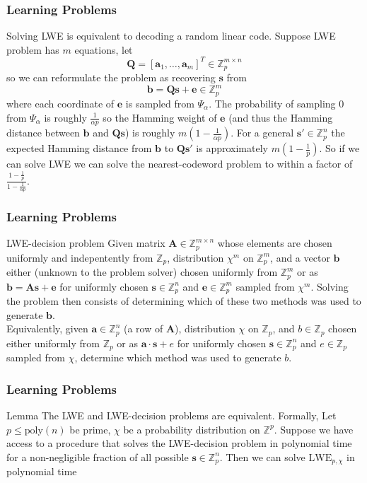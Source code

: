 \documentclass{beamer}
\renewcommand{\v}{\mathbf}
\begin{document}
\begin{frame}
\frametitle{Learning Problems}
Solving LWE is equivalent to decoding a random linear code.
Suppose LWE problem has $m$ equations, let 
\[
    \v{Q} = [\v{a}_1,\ldots,\v{a}_m]^T \in \mathbb{Z}^{m\times n}_p
\]
so we can reformulate the problem as recovering $\v{s}$ from
\[
    \v{b} = \v{Qs+e} \in \mathbb{Z}_p^m
\]
where each coordinate of $\v{e}$ is sampled from $\Psi_\alpha$.
The probability of sampling 0 from $\Psi_\alpha$ is roughly $\frac{1}{\alpha p}$
so the Hamming weight of $\v{e}$ (and thus the Hamming distance 
between $\v{b}$ and $\v{Qs}$) 
is roughly 
$m\left(1-\frac{1}{\alpha p}\right)$. 
For a general $\v{s}' \in \mathbb{Z}_p^n$ the expected Hamming distance
from $\v{b}$ to $\v{Qs}'$ is approximately $m\left(1-\frac{1}{p}\right)$.
So if we can solve LWE we can solve the nearest-codeword problem
to within a factor of $\frac{1-\frac{1}{p}}{1-\frac{1}{\alpha p}}$.
\end{frame}

\begin{frame}
\frametitle{Learning Problems}
\begin{block}{LWE-decision problem}
Given matrix $\v{A} \in \mathbb{Z}_p^{m \times n}$
whose elements are chosen uniformly and indepentently from $\mathbb{Z}_p$, distribution $\chi^m$ on $\mathbb{Z}_p^m$,
and a vector $\v{b}$ either (unknown to the problem solver) chosen
uniformly from $\mathbb{Z}_p^m$ or as $\v{b} = \v{A}\v{s} + \v{e}$
for uniformly chosen $\v{s} \in \mathbb{Z}_p^n$ and $\v{e} \in \mathbb{Z}_p^m$ sampled from $\chi^m$. 
Solving the problem then consists of determining
which of these two methods was used to generate $\v{b}$.
\bigskip \\
Equivalently, given $\v{a} \in \mathbb{Z}_p^n$ (a row of $\v{A}$),
distribution $\chi$ on $\mathbb{Z}_p$, and $b \in \mathbb{Z}_p$
chosen either uniformly from $\mathbb{Z}_p$ or as 
$\v{a} \cdot \v{s} + e$ for uniformly chosen $\v{s} \in \mathbb{Z}_p^n$
and $e \in \mathbb{Z}_p$ sampled from $\chi$, determine which method
was used to generate $b$.
\end{block}
\end{frame}

\begin{frame}
\frametitle{Learning Problems}
\begin{block}{Lemma}
The LWE and LWE-decision problems are equivalent. Formally,
Let $p \leq \text{poly}(n)$ be prime, $\chi$ be a probability distribution on
$\mathbb{Z}^p$. Suppose we have access to a procedure that solves the LWE-decision
problem in polynomial time for a non-negligible fraction of all possible $\v{s} \in
\mathbb{Z}_p^n$. Then we can solve $\text{LWE}_{p,\chi}$ in polynomial
time
\end{block}
\end{frame}
\end{document}
